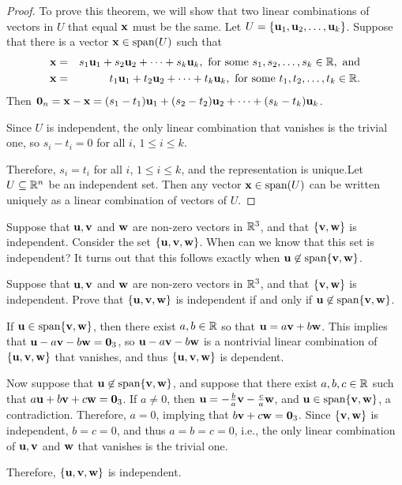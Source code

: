 \begin{proof}
To prove this theorem, we will show that two linear combinations of vectors in $U$ that equal $\mbox{\bf x}$ must be the same. Let $U =\{\mbox{\bf u}_1, \mbox{\bf u}_2, \ldots, \mbox{\bf u}_k\}$.
Suppose that there is a vector $\mbox{\bf x}\in \mbox{\rm span}(U)$ such that
\begin{eqnarray*}
\mbox{\bf x} & = & s_1\mbox{\bf u}_1 + s_2\mbox{\bf u}_2 + \cdots + s_k\mbox{\bf u}_k,
\mbox{ for some } s_1, s_2, \ldots, s_k\in\mathbb{R}, \mbox{ and} \\
\mbox{\bf x} & = & t_1\mbox{\bf u}_1 + t_2\mbox{\bf u}_2 + \cdots + t_k\mbox{\bf u}_k,
\mbox{ for some } t_1, t_2, \ldots, t_k\in\mathbb{R}.
\end{eqnarray*}
Then 
$\mbox{\bf 0}_n=\mbox{\bf x}-\mbox{\bf x} = (s_1-t_1)\mbox{\bf u}_1 + (s_2-t_2)\mbox{\bf u}_2 + \cdots +
(s_k-t_k)\mbox{\bf u}_k$.

Since $U$ is independent, the only linear combination that vanishes
is the trivial one, so $s_i-t_i=0$ for all $i$, $1\leq i\leq k$.

Therefore, $s_i=t_i$ for all $i$, $1\leq i\leq k$, and the
representation is unique.Let $U \subseteq\mathbb{R}^n$ be an independent set.
Then any vector $\mbox{\bf x}\in\mbox{\rm span}(U)$ can be written uniquely as a linear combination of vectors of $U$.
\end{proof}

Suppose that $\mbox{\bf u},\mbox{\bf v}$ and $\mbox{\bf w}$ are non-zero vectors in $\mathbb{R}^3$,
and that $\{\mbox{\bf v},\mbox{\bf w}\}$ is independent. Consider the set $\{\mbox{\bf u},\mbox{\bf v},\mbox{\bf w}\}$. When can we know that this set is independent? It turns out that this follows exactly when $\mbox{\bf u}\not\in\mbox{\rm span}\{\mbox{\bf v},\mbox{\bf w}\}$.

\begin{example}{}{}
Suppose that $\mbox{\bf u},\mbox{\bf v}$ and $\mbox{\bf w}$ are non-zero vectors in $\mathbb{R}^3$,
and that $\{\mbox{\bf v},\mbox{\bf w}\}$ is independent.
Prove that $\{\mbox{\bf u},\mbox{\bf v},\mbox{\bf w}\}$ is independent if and only if 
$\mbox{\bf u}\not\in\mbox{\rm span}\{\mbox{\bf v},\mbox{\bf w}\}$.
\end{example}

\begin{solution}
If $\mbox{\bf u}\in\mbox{\rm span}\{\mbox{\bf v},\mbox{\bf w}\}$, then there exist $a,b\in\mathbb{R}$ so
that $\mbox{\bf u}=a\mbox{\bf v} + b\mbox{\bf w}$.
This implies that $\mbox{\bf u}-a\mbox{\bf v} - b\mbox{\bf w}=\mbox{\bf 0}_3$,
so  $\mbox{\bf u}-a\mbox{\bf v} - b\mbox{\bf w}$
is a nontrivial linear combination of $\{\mbox{\bf u},\mbox{\bf v},\mbox{\bf w}\}$ that
vanishes, 
and thus $\{\mbox{\bf u},\mbox{\bf v},\mbox{\bf w}\}$ is dependent.

Now suppose that $\mbox{\bf u}\not\in\mbox{\rm span}\{\mbox{\bf v},\mbox{\bf w}\}$, and suppose
that there exist $a,b,c\in\mathbb{R}$ such that
$a\mbox{\bf u}+b\mbox{\bf v}+c\mbox{\bf w}=\mbox{\bf 0}_3$.
If $a\neq 0$, then $\mbox{\bf u}=-\frac{b}{a}\mbox{\bf v}-\frac{c}{a}\mbox{\bf w}$,
and $\mbox{\bf u}\in\mbox{\rm span}\{\mbox{\bf v},\mbox{\bf w}\}$, a contradiction.
Therefore, $a=0$, implying that $b\mbox{\bf v}+c\mbox{\bf w}=\mbox{\bf 0}_3$.
Since $\{\mbox{\bf v},\mbox{\bf w}\}$ is independent, $b=c=0$, and thus
$a=b=c=0$, i.e., the only linear combination of 
$\mbox{\bf u},\mbox{\bf v}$ and $\mbox{\bf w}$ that vanishes is the trivial one.

Therefore, $\{\mbox{\bf u},\mbox{\bf v},\mbox{\bf w}\}$ is independent.
\end{solution}

